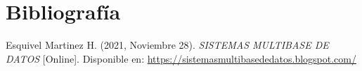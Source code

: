\section{Bibliografía}

\begin{biblio}
	\item Esquivel Martinez H. (2021, Noviembre 28). \textit{SISTEMAS MULTIBASE DE DATOS} [Online]. Disponible en: \newline \url{https://sistemasmultibasededatos.blogspot.com/}
\end{biblio}